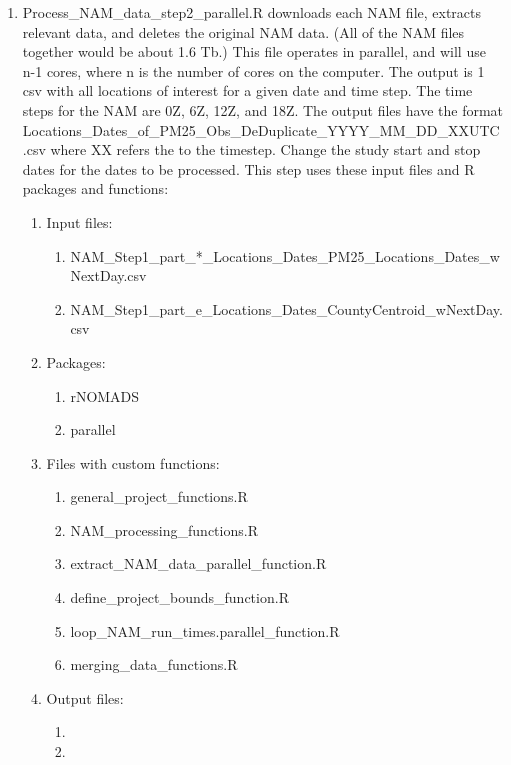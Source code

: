 \begin{enumerate}
\item Process\_NAM\_data\_step2\_parallel.R downloads each NAM file, extracts relevant data, and deletes the original NAM data. (All of the NAM files together would be about 1.6 Tb.) This file operates in parallel, and will use n-1 cores, where n is the number of cores on the computer. The output is 1 csv with all locations of interest for a given date and time step. The time steps for the NAM are 0Z, 6Z, 12Z, and 18Z. The output files have the format Locations\_Dates\_of\_PM25\_Obs\_DeDuplicate\_YYYY\_MM\_DD\_XXUTC.csv where XX refers the to the timestep. Change the study start and stop dates for the dates to be processed. This step uses these input files and R packages and functions:
\begin{enumerate}
	\item Input files:
		\begin{enumerate}
		\item NAM\_Step1\_part\_*\_Locations\_Dates\_PM25\_Locations\_Dates\_wNextDay.csv
		\item NAM\_Step1\_part\_e\_Locations\_Dates\_CountyCentroid\_wNextDay.csv
		\end{enumerate}
	\item Packages:
		\begin{enumerate}
		\item rNOMADS
		\item parallel
		\end{enumerate}
	\item Files with custom functions:
		\begin{enumerate}
		\item general\_project\_functions.R 
		\item NAM\_processing\_functions.R
		\item extract\_NAM\_data\_parallel\_function.R
		\item define\_project\_bounds\_function.R
		\item loop\_NAM\_run\_times.parallel\_function.R
		\item merging\_data\_functions.R
		\end{enumerate}
	\item Output files:
		\begin{enumerate}
		\item 
		\item 
		\end{enumerate}
	\end{enumerate}



\end{enumerate}
